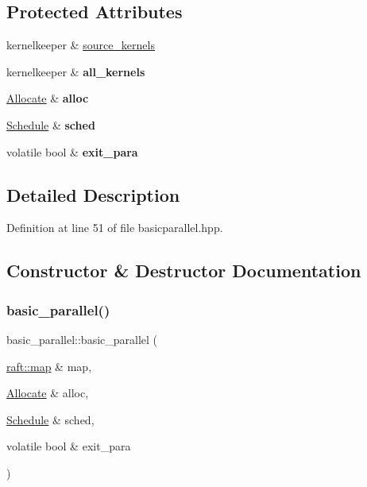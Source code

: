 \subsection*{Protected Attributes}
\begin{DoxyCompactItemize}
\item 
kernelkeeper \& \hyperlink{classbasic__parallel_a969b8832b2f6eaea5e985d4582d9e4dc}{source\+\_\+kernels}
\item 
\hypertarget{classbasic__parallel_a028feb03732d5fef0e9d184ddc18ce7b}{}\label{classbasic__parallel_a028feb03732d5fef0e9d184ddc18ce7b} 
kernelkeeper \& {\bfseries all\+\_\+kernels}
\item 
\hypertarget{classbasic__parallel_aab09daae41a9d218568115be037a8357}{}\label{classbasic__parallel_aab09daae41a9d218568115be037a8357} 
\hyperlink{class_allocate}{Allocate} \& {\bfseries alloc}
\item 
\hypertarget{classbasic__parallel_a9124d0bfd5d75277ddd44fb59814435a}{}\label{classbasic__parallel_a9124d0bfd5d75277ddd44fb59814435a} 
\hyperlink{class_schedule}{Schedule} \& {\bfseries sched}
\item 
\hypertarget{classbasic__parallel_ac648d03dceed09e7834d656f561da33b}{}\label{classbasic__parallel_ac648d03dceed09e7834d656f561da33b} 
volatile bool \& {\bfseries exit\+\_\+para}
\end{DoxyCompactItemize}


\subsection{Detailed Description}


Definition at line 51 of file basicparallel.\+hpp.



\subsection{Constructor \& Destructor Documentation}
\hypertarget{classbasic__parallel_a8c444469221caca20b1b04762636df78}{}\label{classbasic__parallel_a8c444469221caca20b1b04762636df78} 
\subsubsection{\texorpdfstring{basic\+\_\+parallel()}{basic\_parallel()}}
{\footnotesize\ttfamily basic\+\_\+parallel\+::basic\+\_\+parallel (\begin{DoxyParamCaption}\item[{\hyperlink{classraft_1_1map}{raft\+::map} \&}]{map,  }\item[{\hyperlink{class_allocate}{Allocate} \&}]{alloc,  }\item[{\hyperlink{class_schedule}{Schedule} \&}]{sched,  }\item[{volatile bool \&}]{exit\+\_\+para }\end{DoxyParamCaption})}

